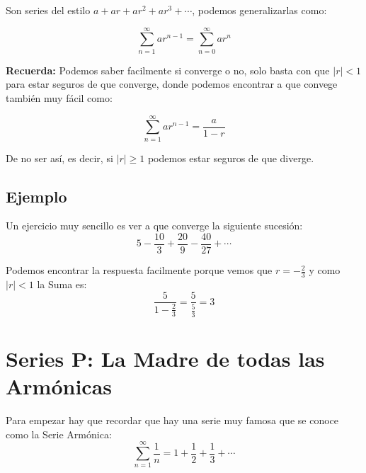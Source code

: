 \documentclass[12pt]{report}                                %
\begin{document}
        Son series del estilo $a + ar + ar^2 + ar^3 + \cdots$, podemos
        generalizarlas como:

        \begin{equation}
            \sum_{n=1}^{\infty} ar^{n-1} = \sum_{n=0}^{\infty} ar^n 
        \end{equation}


        \textbf{Recuerda:}
        Podemos saber facilmente si converge o no, solo basta con que $|r| < 1$ 
        para estar seguros de que converge, donde podemos encontrar a que convege
        también muy fácil como:

        \begin{equation}
            \sum_{n=1}^{\infty} ar^{n-1} = \frac{a}{1-r}
        \end{equation}

        De no ser así, es decir, si $|r| \geq 1$ podemos estar seguros de que diverge.


        \subsection{Ejemplo}
        Un ejercicio muy sencillo es ver a que converge la siguiente sucesión:
        \begin{equation*}
            5 - \frac{10}{3} + \frac{20}{9} - \frac{40}{27} + \cdots
        \end{equation*}

        Podemos encontrar la respuesta facilmente porque vemos que
        $r=-\frac{2}{3}$ y como $|r|<1$ la Suma es:
        \begin{equation*}
            \frac{5}{1-\frac{2}{3}} = \frac{5}{\frac{5}{3}} = 3
        \end{equation*}



    \clearpage
    \section{Series P: La Madre de todas las Armónicas}
        Para empezar hay que recordar que hay una serie muy famosa que se conoce como
        la Serie Armónica:
        \begin{equation}
            \sum_{n=1}^{\infty} \frac{1}{n} = 1 + \frac{1}{2}  + \frac{1}{3} + \cdots
        \end{equation}
\end{document}
